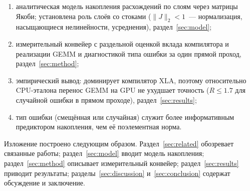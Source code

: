 \begin{enumerate}\setlength\itemsep{2pt}
    \item аналитическая модель накопления расхождений по слоям через матрицы
        Якоби; установлена роль слоёв со стоками ($\|J\|_2<1$~--- нормализация,
        насыщающиеся нелинейности, усреднения), раздел~\ref{sec:model};
    \item измерительный конвейер с раздельной оценкой вклада компилятора и
        реализации GEMM и диагностикой типа ошибки за один прямой проход,
        раздел~\ref{sec:method};
    \item эмпирический вывод: доминирует компилятор XLA, поэтому относительно
        CPU-эталона перенос GEMM на GPU не ухудшает точность ($R\le1.7$ для
        случайной ошибки в прямом проходе), раздел~\ref{sec:results};
    \item тип ошибки (смещённая или случайная) служит более информативным
        предиктором накопления, чем её поэлементная норма.
\end{enumerate}

Изложение построено следующим образом. Раздел~\ref{sec:related} обозревает
связанные работы; раздел~\ref{sec:model} вводит модель накопления;
раздел~\ref{sec:method} описывает измерительный конвейер;
раздел~\ref{sec:results} приводит результаты; разделы~\ref{sec:discussion}
и~\ref{sec:conclusion} содержат обсуждение и заключение.
